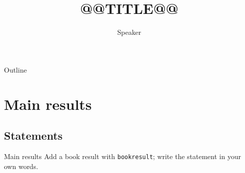 \documentclass{beamer}
\title{@@TITLE@@}
\author{Speaker}
\institute{}
\date{}
\begin{document}
\begin{frame}
  \titlepage
\end{frame}
\begin{frame}{Outline}
  \tableofcontents
\end{frame}
\section{Main results}
\subsection{Statements}
\begin{frame}{Main results}
  Add a book result with \texttt{bookresult}; write the statement in your own words.
\end{frame}
\appendix
\FormalVerification
\end{document}
